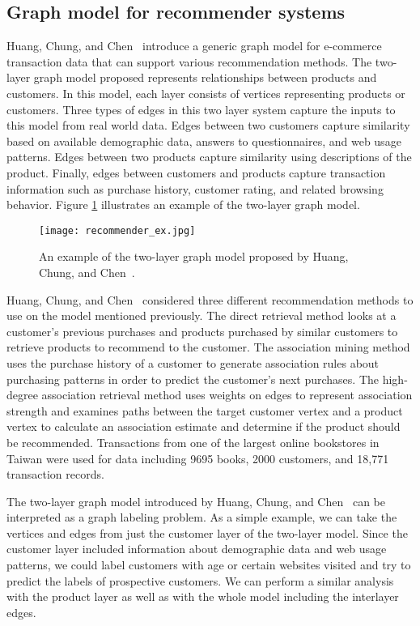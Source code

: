 \subsection{Graph model for recommender systems}
Huang, Chung, and Chen~\cite{huang2004graph} introduce a generic graph model for e-commerce transaction data that can support various recommendation methods. The two-layer graph model proposed represents relationships between products and customers. In this model, each layer consists of vertices representing products or customers. Three types of edges in this two layer system capture the inputs to this model from real world data. Edges between two customers capture similarity based on available demographic data, answers to questionnaires, and web usage patterns. Edges between two products capture similarity using descriptions of the product. Finally, edges between customers and products capture transaction information such as purchase history, customer rating, and related browsing behavior. Figure \ref{fig:recommender_example} illustrates an example of the two-layer graph model.

\begin{figure}[h]
\centering
\texttt{[image: recommender\_ex.jpg]}
\caption{An example of the two-layer graph model proposed by Huang, Chung, and Chen~\cite{huang2004graph}.}
\label{fig:recommender_example}
\end{figure}

Huang, Chung, and Chen~\cite{huang2004graph} considered three different recommendation methods to use on the model mentioned previously. The direct retrieval method looks at a customer's previous purchases and products purchased by similar customers to retrieve products to recommend to the customer. The association mining method uses the purchase history of a customer to generate association rules about purchasing patterns in order to predict the customer's next purchases. The high-degree association retrieval method uses weights on edges to represent association strength and examines paths between the target customer vertex and a product vertex to calculate an association estimate and determine if the product should be recommended. Transactions from one of the largest online bookstores in Taiwan were used for data including 9695 books, 2000 customers, and 18,771 transaction records.

The two-layer graph model introduced by Huang, Chung, and Chen~\cite{huang2004graph} can be interpreted as a graph labeling problem. As a simple example, we can take the vertices and edges from just the customer layer of the two-layer model. Since the customer layer included information  about demographic data and web usage patterns, we could label customers with age or certain websites visited and try to predict the labels of prospective customers. We can perform a similar analysis with the product layer as well as with the whole model including the interlayer edges.


